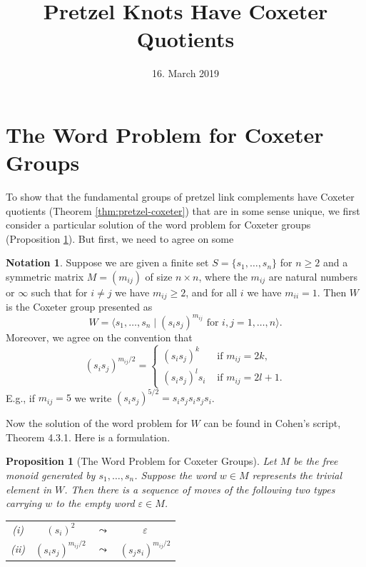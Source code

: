 \documentclass[11pt]{article}
\title{Pretzel Knots Have Coxeter Quotients}
\date{16. March 2019}
\newtheorem{proposition}[theorem]{Proposition}
\theoremstyle{definition}
\newtheorem{notation}[theorem]{Notation}
\begin{document}
\section{The Word Problem for Coxeter Groups}

To show that the fundamental groups of pretzel link complements have Coxeter quotients (Theorem \ref{thm:pretzel-coxeter}) that are in some sense unique, we first consider a particular solution of the word problem for Coxeter groups (Proposition \ref{prop:word-problem-coxeter}). But first, we need to agree on some

\begin{notation}\label{not:coxeter-groups}
Suppose we are given a finite set $S = \{s_1, \dots, s_n\}$ for $n \geq 2$ and a symmetric matrix $M = (m_{ij})$ of size $n \times n$, where the $m_{ij}$ are natural numbers or $\infty$ such that for $i \neq j$ we have $m_{ij} \geq 2$,
and for all $i$ we have
$m_{ii} = 1.$
Then $W$ is the Coxeter group presented as
$$W = \langle s_1, \dots, s_n \; | \; (s_is_j)^{m_{ij}} \text{ for } i, j = 1, \dots, n \rangle.$$
Moreover, we agree on the convention that
$$(s_is_j)^{m_{ij}/2} =  \begin{cases}
(s_is_j)^k & \text{ if } m_{ij} = 2k, \\
(s_is_j)^ls_i & \text{ if } m_{ij} = 2l + 1.
\end{cases}$$
E.g., if $m_{ij}=5$ we write $(s_is_j)^{5/2} = s_is_js_is_js_i$. 
\end{notation}

Now the solution of the word problem for $W$ can be found in Cohen's script, Theorem 4.3.1. Here is a formulation.

\begin{proposition}[The Word Problem for Coxeter Groups]\label{prop:word-problem-coxeter}
Let $M$ be the free monoid generated by $s_1, \dots, s_n$. Suppose the word $w \in M$ represents the trivial element in $W$. Then there is a sequence of moves of the following two types carrying $w$ to the empty word $\varepsilon \in M$.
\begin{center}
\begin{tabular}{c c c c}
\textup{(}i\textup{)} & $(s_i)^2$ & $\leadsto$ & $\varepsilon$ \\
\textup{(}ii\textup{)} & $(s_is_j)^{m_{ij}/2}$ & $\leadsto$ & $(s_js_i)^{m_{ij}/2}$ \\
\end{tabular}
\end{center}
\end{proposition}
\end{document}
